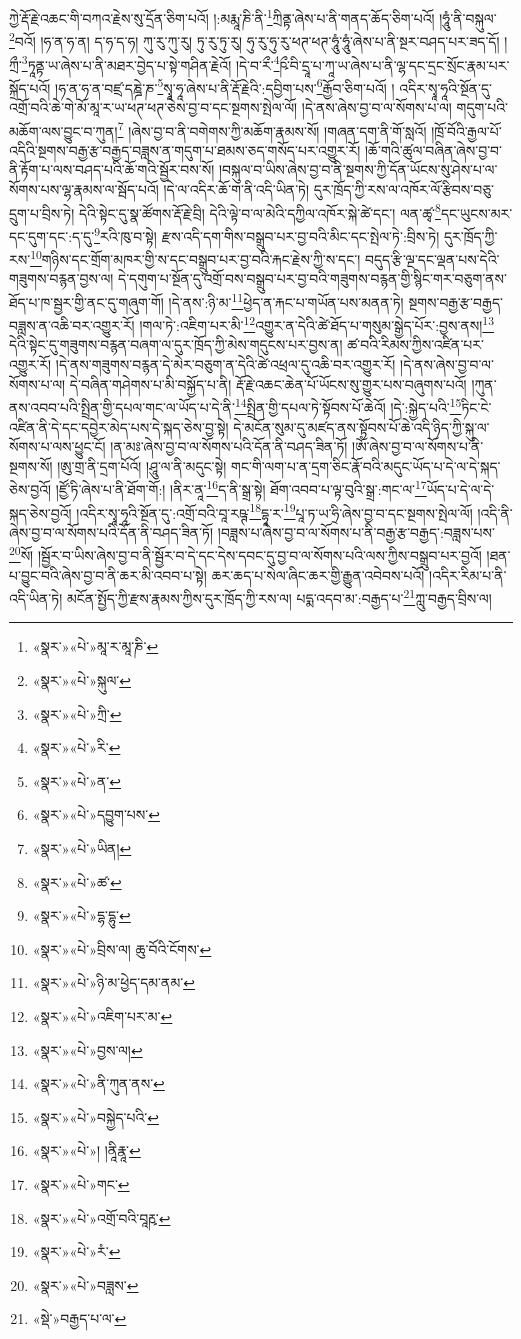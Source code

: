 ཀྱེ་རྡོ་རྗེ་འཆང་གི་བཀའ་རྗེས་སུ་དྲོན་ཅིག་པའོ། །:མརྨཱ་ཎི་ནི་\footnote{«སྣར་»«པེ་»མཱ་ར་མཱ་ཎི་}ཀྲིནྟ་ཞེས་པ་ནི་གནད་ཆོད་ཅིག་པའོ། །ཧཱུཾ་ནི་བསྐུལ་\footnote{«སྣར་»«པེ་»སྐུལ་}བའོ། །ཧ་ན་ཧ་ན། ད་ཧ་ད་ཧ། ཀུ་རུ་ཀུ་རུ། ཏུ་རུ་ཏུ་རུ། ཧུ་རུ་ཧུ་རུ་ཕཊ་ཕཊ་ཧཱུཾ་ཧཱུཾ་ཞེས་པ་ནི་སྔར་བཤད་པར་ཟད་དོ། །ཀྲྀ་\footnote{«སྣར་»«པེ་»ཀྲི་}ཏཱནྟ་ཡ་ཞེས་པ་ནི་མཐར་བྱེད་པ་སྟེ་གཤིན་རྗེའོ། །དེ་བ་རྀ་\footnote{«སྣར་»«པེ་»རི་}ཥྀ་བི་དྲཱ་པ་ཀཱ་ཡ་ཞེས་པ་ནི་ལྷ་དང་དྲང་སྲོང་རྣམ་པར་སྐྲོད་པའོ། །ཧ་ན་ཧ་ན་བཛྲ་དཎྜེ་ཎ་\footnote{«སྣར་»«པེ་»ན་}སྭཱ་ཧཱ་ཞེས་པ་ནི་རྡོ་རྗེའི་:དབྱིག་པས་\footnote{«སྣར་»«པེ་»དབྱུག་པས་}རྒྱོབ་ཅིག་པའོ། །
འདིར་སྭཱ་ཧཱའི་སྔོན་དུ་འགྲོ་བའི་ཆེ་གེ་མོ་མཱ་ར་ཡ་ཕཊ་ཕཊ་ཅེས་བྱ་བ་དང་སྔགས་སྤེལ་ལོ། །དེ་ནས་ཞེས་བྱ་བ་ལ་སོགས་པ་ལ། གདུག་པའི་མཆོག་ལས་བྱུང་བ་ཀུན།\footnote{«སྣར་»«པེ་»ཡིན།} །ཞེས་བྱ་བ་ནི་བགེགས་ཀྱི་མཆོག་རྣམས་སོ། །གཞན་དག་ནི་གོ་སླའོ། །ཁྲོ་བོའི་རྒྱལ་པོ་འདིའི་སྔགས་བརྒྱ་རྩ་བརྒྱད་བཟླས་ན་གདུག་པ་ཐམས་ཅད་གསོད་པར་འགྱུར་རོ། །ཆོ་གའི་ཚུལ་བཞིན་ཞེས་བྱ་བ་ནི་རྟོག་པ་ལས་བཤད་པའི་ཆོ་གའི་སྦྱོར་བས་སོ། །བསྐུལ་བ་ཡིས་ཞེས་བྱ་བ་ནི་སྔགས་ཀྱི་དོན་ཡོངས་སུ་ཤེས་པ་ལ་སོགས་པས་ལྷ་རྣམས་ལ་སྦོད་པའོ། །དེ་ལ་འདིར་ཆོ་ག་ནི་འདི་ཡིན་ཏེ། དུར་ཁྲོད་ཀྱི་རས་ལ་འཁོར་ལོ་རྩིབས་བཅུ་དྲུག་པ་བྲིས་ཏེ། དེའི་སྟེང་དུ་སྣ་ཚོགས་རྡོ་རྗེ་བྲི། དེའི་ལྟེ་བ་ལ་མེའི་དཀྱིལ་འཁོར་སྐེ་ཚེ་དང་། ལན་ཚྭ་\footnote{«སྣར་»«པེ་»ཚ་}དང་ཡུངས་མར་དང་དུག་དང་:ད་དུ་\footnote{«སྣར་»«པེ་»དྷ་དྷུ་}རའི་ཁུ་བ་སྟེ། རྫས་འདི་དག་གིས་བསྒྲུབ་པར་བྱ་བའི་མིང་དང་སྤེལ་ཏེ་:བྲིས་ཏེ། དུར་ཁྲོད་ཀྱི་རས་\footnote{«སྣར་»«པེ་»བྲིས་ལ། ཆུ་བོའི་ངོགས་}གཉིས་དང་གྲོག་མཁར་གྱི་ས་དང་བསྒྲུབ་པར་བྱ་བའི་རྐང་རྗེས་ཀྱི་ས་དང་། བདུད་རྩི་ལྔ་དང་ལྡན་པས་དེའི་གཟུགས་བརྙན་བྱས་ལ། དེ་དགུག་པ་སྔོན་དུ་འགྲོ་བས་བསྒྲུབ་པར་བྱ་བའི་གཟུགས་བརྙན་གྱི་སྙིང་གར་བཅུག་ནས་ཐོད་པ་ཁ་སྦྱར་གྱི་ནང་དུ་གཞུག་གོ། །དེ་ནས་:ཉི་མ་\footnote{«སྣར་»«པེ་»ཉི་མ་ཕྱེད་དམ་ནམ་}ཕྱེད་ན་རྐང་པ་གཡོན་པས་མནན་ཏེ། སྔགས་བརྒྱ་རྩ་བརྒྱད་བཟླས་ན་འཆི་བར་འགྱུར་རོ། །གལ་ཏེ་:འཇིག་པར་མི་\footnote{«སྣར་»«པེ་»འཇིག་པར་མ་}འགྱུར་ན་དེའི་ཚེ་ཐོད་པ་གསུམ་སྒྱེད་པོར་:བྱས་ནས།\footnote{«སྣར་»«པེ་»བྱས་ལ།} དེའི་སྟེང་དུ་གཟུགས་བརྙན་བཞག་ལ་དུར་ཁྲོད་ཀྱི་མེས་གདུངས་པར་བྱས་ན། ཚ་བའི་རིམས་ཀྱིས་འཛིན་པར་འགྱུར་རོ། །དེ་ནས་གཟུགས་བརྙན་དེ་མེར་བཅུག་ན་དེའི་ཚེ་འཕྲལ་དུ་འཆི་བར་འགྱུར་རོ། །དེ་ནས་ཞེས་བྱ་བ་ལ་སོགས་པ་ལ། དེ་བཞིན་གཤེགས་པ་མི་བསྐྱོད་པ་ནི། རྡོ་རྗེ་འཆང་ཆེན་པོ་ཡོངས་སུ་གྱུར་པས་བཞུགས་པའོ། །ཀུན་ནས་འབབ་པའི་སྤྲིན་གྱི་དཔལ་གང་ལ་ཡོད་པ་དེ་ནི་\footnote{«སྣར་»«པེ་»ནི་ཀུན་ནས་}སྤྲིན་གྱི་དཔལ་ཏེ་སྟོབས་པོ་ཆེའོ། །དེ་:སྐྱེད་པའི་\footnote{«སྣར་»«པེ་»བསྐྱེད་པའི་}ཏིང་ངེ་འཛིན་ནི་དེ་དང་དབྱེར་མེད་པས་དེ་སྐད་ཅེས་བྱ་སྟེ། དེ་མངོན་སུམ་དུ་མཛད་ནས་སྟོབས་པོ་ཆེ་འདི་ཉིད་ཀྱི་སྐུ་ལ་སོགས་པ་ལས་ཕྱུང་ངོ། །ན་མཿ་ཞེས་བྱ་བ་ལ་སོགས་པའི་དོན་ནི་བཤད་ཟིན་ཏོ། །ཨོཾ་ཞེས་བྱ་བ་ལ་སོགས་པ་ནི་སྔགས་སོ། །ཨུ་གྲ་ནི་དྲག་པོའོ། །ཤཱུ་ལ་ནི་མདུང་སྟེ། གང་གི་ལག་པ་ན་དྲག་ཅིང་རྣོ་བའི་མདུང་ཡོད་པ་དེ་ལ་དེ་སྐད་ཅེས་བྱའོ། །ཛྱོ་ཏི་ཞེས་པ་ནི་ཐོག་གོ:། །ནིར་ནཱ་\footnote{«སྣར་»«པེ་»། །ནཱིརྣཱ་}ད་ནི་སྒྲ་སྟེ། ཐོག་འབབ་པ་ལྟ་བུའི་སྒྲ་:གང་ལ་\footnote{«སྣར་»«པེ་»གང་}ཡོད་པ་དེ་ལ་དེ་སྐད་ཅེས་བྱའོ། །འདིར་སྭཱ་ཧཱའི་སྔོན་དུ་:འགྲོ་བའི་བཱ་རཥྚ་\footnote{«སྣར་»«པེ་»འགྲོ་བའི་བཱརྵ་}དྷཱ་ར་\footnote{«སྣར་»«པེ་»རཾ་}པཱ་ཏ་ཡ་ཧྲི་ཞེས་བྱ་བ་དང་སྔགས་སྤེལ་ལོ། །འདི་ནི་ཞེས་བྱ་བ་ལ་སོགས་པའི་དོན་ནི་བཤད་ཟིན་ཏོ། །བཟླས་པ་ཞེས་བྱ་བ་ལ་སོགས་པ་ནི་བརྒྱ་རྩ་བརྒྱད་:བཟླས་པས་\footnote{«སྣར་»«པེ་»བཟླས་}སོ། །སྦྱོར་བ་ཡིས་ཞེས་བྱ་བ་ནི་སྦྱོར་བ་དེ་དང་དེས་དབང་དུ་བྱ་བ་ལ་སོགས་པའི་ལས་ཀྱིས་བསྒྲུབ་པར་བྱའོ། །ཐན་པ་བྱུང་བའི་ཞེས་བྱ་བ་ནི་ཆར་མི་འབབ་པ་སྟེ། ཆར་ཆད་པ་སེལ་ཞིང་ཆར་གྱི་རྒྱུན་འབེབས་པའོ། །འདིར་རིམ་པ་ནི་འདི་ཡིན་ཏེ། མངོན་སྤྱོད་ཀྱི་རྫས་རྣམས་ཀྱིས་དུར་ཁྲོད་ཀྱི་རས་ལ། པདྨ་འདབ་མ་:བརྒྱད་པ་\footnote{«སྡེ་»བརྒྱད་པ་ལ་}ཀླུ་བརྒྱད་བྲིས་ལ། 
